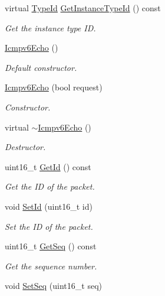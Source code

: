 \begin{DoxyCompactItemize}
\item 
virtual \hyperlink{classns3_1_1TypeId}{Type\+Id} \hyperlink{classns3_1_1Icmpv6Echo_a3307c0ab8090d7d2b8c2fda4d01e9117}{Get\+Instance\+Type\+Id} () const 
\begin{DoxyCompactList}\small\item\em Get the instance type ID. \end{DoxyCompactList}\item 
\hyperlink{classns3_1_1Icmpv6Echo_a29b1869fae687ceae8f4af7499b96ba6}{Icmpv6\+Echo} ()
\begin{DoxyCompactList}\small\item\em Default constructor. \end{DoxyCompactList}\item 
\hyperlink{classns3_1_1Icmpv6Echo_a400d956568fb9f2d7fee3f7ca7672f3c}{Icmpv6\+Echo} (bool request)
\begin{DoxyCompactList}\small\item\em Constructor. \end{DoxyCompactList}\item 
virtual \hyperlink{classns3_1_1Icmpv6Echo_a72923030d8deba5499b80f42a8e2c0b7}{$\sim$\+Icmpv6\+Echo} ()
\begin{DoxyCompactList}\small\item\em Destructor. \end{DoxyCompactList}\item 
uint16\+\_\+t \hyperlink{classns3_1_1Icmpv6Echo_ad1190ed2fdbc21dcd34c3fd6800a3ee0}{Get\+Id} () const 
\begin{DoxyCompactList}\small\item\em Get the ID of the packet. \end{DoxyCompactList}\item 
void \hyperlink{classns3_1_1Icmpv6Echo_a08025d20d134edc3cc8fa87e62888cd9}{Set\+Id} (uint16\+\_\+t id)
\begin{DoxyCompactList}\small\item\em Set the ID of the packet. \end{DoxyCompactList}\item 
uint16\+\_\+t \hyperlink{classns3_1_1Icmpv6Echo_ad5de3cb93d5a8e12e000e7a00a3bdd93}{Get\+Seq} () const 
\begin{DoxyCompactList}\small\item\em Get the sequence number. \end{DoxyCompactList}\item 
void \hyperlink{classns3_1_1Icmpv6Echo_aab33d0d6faee9d9aab459a63d5b9d012}{Set\+Seq} (uint16\+\_\+t seq)

\end{DoxyCompactItemize}
